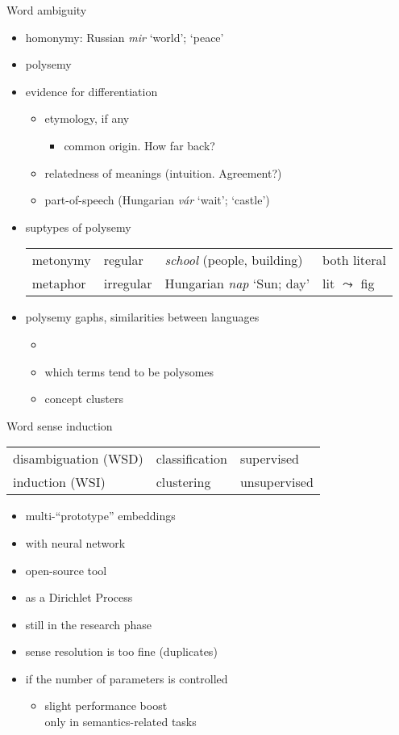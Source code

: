 \documentclass[10pt]{beamer}%
\newcommand{\bull}[1]{\begin{itemize}\item #1 \end{itemize}}
\begin{document}
\begin{frame}{Word ambiguity}
  \begin{itemize}
    \item homonymy: Russian \emph{mir} `world'; `peace'
    \item polysemy
    \item evidence for differentiation
      \begin{itemize}
        \item etymology, if any
          \bull{common origin. How far back?}
        \item relatedness of meanings (intuition. Agreement?)
        \item part-of-speech (Hungarian \emph{vár} `wait'; `castle')
      \end{itemize}
    \item suptypes of polysemy
      \begin{tabular}{llll}
        metonymy & regular    & \emph{school} (people, building)  & both literal \\
        metaphor & irregular  & Hungarian \emph{nap} `Sun; day'   & lit $\leadsto$ fig
      \end{tabular}
    \item polysemy gaphs, similarities between languages 
      \begin{itemize}
        \item \citep{Youn:2016}
        \item which terms tend to be polysomes 
        \item concept clusters
      \end{itemize}
  \end{itemize}
\end{frame}
\begin{frame}{Word sense induction}
  \begin{tabular} {lll}
    disambiguation (WSD) & classification & supervised \\
    induction (WSI) \citep{Schutze:1998} & clustering & unsupervised \\
  \end{tabular}
    \begin{itemize}
      \item multi-``prototype'' embeddings \citep{Reisinger:2010}
      \item with neural network \citep{Huang:2012}
      \item open-source tool \citep{Neelakantan:2014}
      \item as a Dirichlet Process \cite{Li:2015,Bartunov:2015}
      \item still in the research phase
      \item sense resolution is too fine (duplicates)
      \item if the number of parameters is controlled 
        \begin{itemize}
          \item slight performance boost \\ 
            only in semantics-related tasks \citep{Li:2015}
        \end{itemize}
    \end{itemize}
\end{frame}
\end{document}
